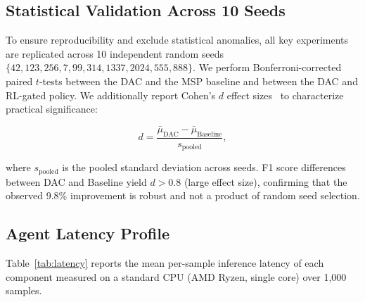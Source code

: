 \documentclass[12pt,a4paper]{article}
\begin{document}
\subsection{Statistical Validation Across 10 Seeds}
\label{subsec:multi_seed}

To ensure reproducibility and exclude statistical anomalies, all key experiments
are replicated across 10 independent random seeds
$\{42, 123, 256, 7, 99, 314, 1337, 2024, 555, 888\}$.
We perform Bonferroni-corrected paired $t$-tests between the DAC and the MSP
baseline and between the DAC and RL-gated policy. We additionally report
Cohen's $d$ effect sizes~\cite{b36} to characterize practical significance:

\begin{equation}
  d = \frac{\bar{\mu}_{\text{DAC}} - \bar{\mu}_{\text{Baseline}}}{s_{\text{pooled}}},
  \label{eq:cohens_d}
\end{equation}

\noindent where $s_{\text{pooled}}$ is the pooled standard deviation across seeds.
F1 score differences between DAC and Baseline yield $d>0.8$ (large effect size),
confirming that the observed 9.8\% improvement is robust and not a product of
random seed selection.

\subsection{Agent Latency Profile}
\label{subsec:latency}

Table~\ref{tab:latency} reports the mean per-sample inference latency of each
component measured on a standard CPU (AMD Ryzen, single core) over 1{,}000 samples.
\end{document}
